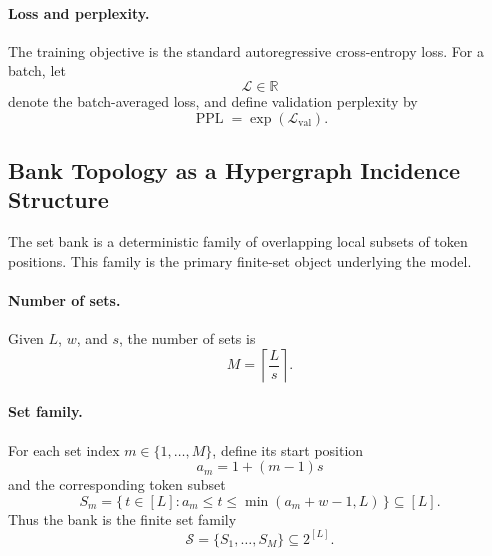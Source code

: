 \documentclass{article}
\theoremstyle{plain}
\theoremstyle{definition}
\theoremstyle{remark}
\begin{document}
\paragraph{Loss and perplexity.}
The training objective is the standard autoregressive cross-entropy loss. For a batch, let
\begin{equation}
\label{eq:loss}
\mathcal{L}\in\mathbb{R}
\end{equation}
denote the batch-averaged loss, and define validation perplexity by
\begin{equation}
\label{eq:perplexity}
\operatorname{PPL}=\exp(\mathcal{L}_{\mathrm{val}}).
\end{equation}

\subsection{Bank Topology as a Hypergraph Incidence Structure}
\label{sec:bank-topology}

The set bank is a deterministic family of overlapping local subsets of token positions. This family is the primary finite-set object underlying the model.

\paragraph{Number of sets.}
Given $L$, $w$, and $s$, the number of sets is
\begin{equation}
\label{eq:num-sets}
M=\left\lceil\frac{L}{s}\right\rceil.
\end{equation}

\paragraph{Set family.}
For each set index $m\in\{1,\dots,M\}$, define its start position
\begin{equation}
\label{eq:set-start}
a_m=1+(m-1)s
\end{equation}
and the corresponding token subset
\begin{equation}
\label{eq:set-definition}
S_m=\{\,t\in[L]: a_m\le t\le \min(a_m+w-1,L)\,\}\subseteq[L].
\end{equation}
Thus the bank is the finite set family
\begin{equation}
\label{eq:set-family}
\mathcal{S}=\{S_1,\dots,S_M\}\subseteq 2^{[L]}.
\end{equation}
\end{document}
